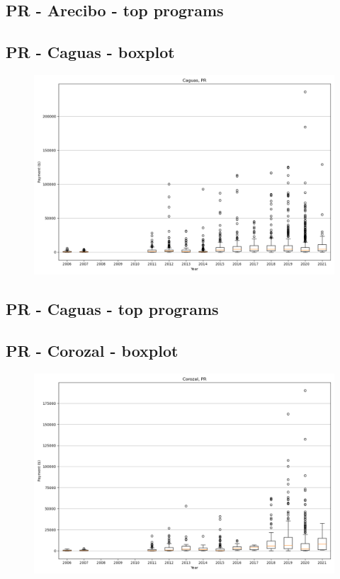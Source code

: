 \subsection*{PR - Arecibo - top programs}

\newpage
\subsection*{PR - Caguas - boxplot}
\begin{figure}[h]
\centering
\includegraphics[width=7in]{../output/boxplots/counties/Caguas-PR_boxplot.png}
\end{figure}


\subsection*{PR - Caguas - top programs}

\newpage
\subsection*{PR - Corozal - boxplot}
\begin{figure}[h]
\centering
\includegraphics[width=7in]{../output/boxplots/counties/Corozal-PR_boxplot.png}
\end{figure}


